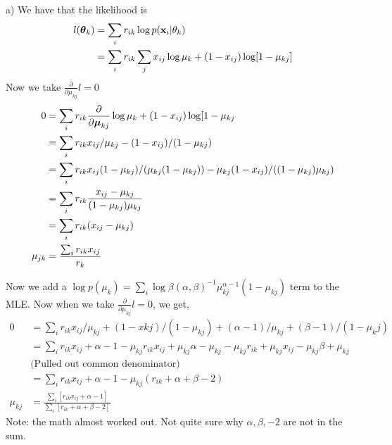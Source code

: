 \documentclass[12pt,letterpaper,fleqn]{hmcpset}
\begin{document}
\vspace{15mm}
a) We have that the likelihood is 
\begin{align*}
    l(\hbox{\boldmath$\theta$}_k) &= \sum_i r_{ik}\log p({\bf x}_i | \theta_k) \\
    &= \sum_i r_{ik} \sum_j x_{ij}\log\mu_k + (1-x_{ij})\log[1-\mu_{kj}] \\
\end{align*}
Now we take $\frac{\partial}{\partial \mu_{kj}} l = 0$
\begin{align*}
    0 &= \sum_i r_{ik} \frac{\partial}{\partial \hbox{\boldmath$\mu$}_{kj}} \log\mu_k + (1-x_{ij})\log[1-\mu_{kj}\\
    &= \sum_i r_{ik} x_{ij}/\mu_{kj} - (1-x_{ij})/(1-\mu_{kj})\\
    &= \sum_i r_{ik} x_{ij}(1-\mu_{kj}) /(\mu_{kj}(1-\mu_{kj})) - \mu_{kj}(1-x_{ij})/((1-\mu_{kj})\mu_{kj}) \\
    &= \sum_i r_{ik} \frac{x_{ij} - \mu_{kj}}{(1-\mu_{kj})\mu_{kj}}\\
    &= \sum_i r_{ik} (x_{ij} - \mu_{kj}) \\
    \mu_{jk} &= \frac{\sum_i r_{ik}x_{ij}}{r_k}
\end{align*}

Now we add a $\log p(\mu_k) = \sum_i \log \beta(\alpha, \beta)^{-1} \mu_{kj}^{\alpha -1} (1-\mu_{kj})$ term to the MLE. Now when we take $\frac{\partial}{\partial \mu_{kj}} l = 0$, we get,
\begin{align*}
    0 &= \sum_i r_{ik}x_{ij}/ \mu_{kj} + (1-x{kj})/(1-\mu_{kj}) + (\alpha -1) / \mu_{kj} + (\beta - 1) / (1-\mu_kj) \\
    &= \sum_{i} r_{ik}x_{ij} + \alpha -1 - \mu_{kj}r_{ik}x_{ij} + \mu_{kj}\alpha - \mu_{kj} - \mu_{kj}r_{ik} + \mu_{kj}x_{ij} - \mu_{kj} \beta + \mu_{kj} \\
    & \text{(Pulled out common denominator)} \\
    &= \sum_i r_{ik}x_{ij} + \alpha -1 - \mu_{kj} (r_{ik} + \alpha + \beta - 2)\\
    \mu_{kj} &= \frac{\sum_i \left[ r_{ik}x_{ij} + \alpha -1 \right]}{\sum_i [r_{ik} + \alpha + \beta -2]}
\end{align*}
Note: the math almost worked out. Not quite sure why $\alpha, \beta, -2$ are not in the sum.

\newpage
\end{document}
